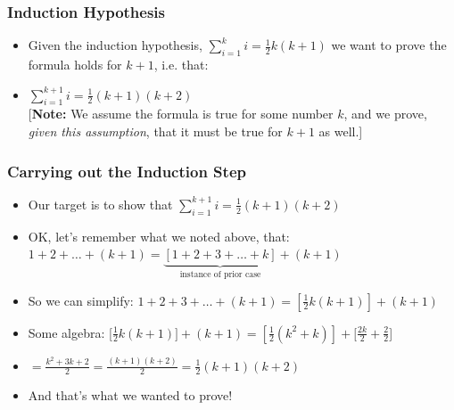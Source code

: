 \begin{frame}
\frametitle{Induction Hypothesis}

\begin{itemize}[<+->]
\item 
Given the induction hypothesis, $\displaystyle\sum_{i=1}^k i = \frac{1}{2}k(k+1)$ we want to prove the formula holds for $k+1$, i.e. that:

\item  $\displaystyle\sum_{i=1}^{k + 1} i = \frac{1}{2}(k + 1)(k+2)$\\[3ex]

[{\bf{Note:}} We assume the formula is true for some number $k$, and we prove, {\it{given this assumption}}, that it must be true for $k+1$ as well.]

\end{itemize} 
\end{frame}

 \begin{frame}
\frametitle{Carrying out the Induction Step}

\begin{itemize}[<+->]
\item Our target is to show that $\displaystyle\sum_{i=1}^{k + 1} i = \frac{1}{2}(k + 1)(k+2)$ %

\item OK, let's remember what we noted above, that:\\[2ex]

 $1+2+\ldots + (k+1) = \underbrace{[1+2+3 + \ldots + k]}_{\text{instance of prior case}} + (k + 1)$ %

\item So we can simplify:  $1+2+3 +\ldots + (k+1) = [\frac{1}{2}k(k+1)] + (k+1)$ %

\item Some algebra: [$\frac{1}{2}k(k+1)] + (k+1) = [\frac{1}{2}(k^2 +k)] + [\frac{2k}{2} + \frac{2}{2}$] %

 \item[] $= \frac{k^2 + 3k +2}{2} = \frac{(k+1)(k+2)}{2} = \frac{1}{2}(k+1)(k+2)$
 
 \item And that's what we wanted to prove! 



\end{itemize} 
\end{frame}

